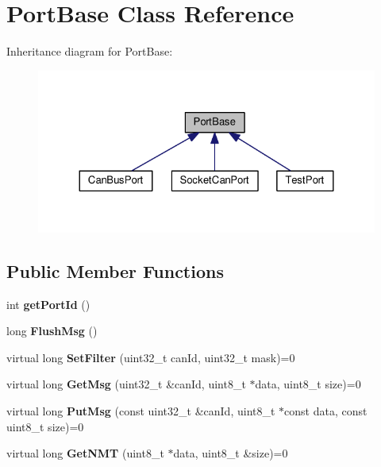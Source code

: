 \hypertarget{classPortBase}{}\section{Port\+Base Class Reference}
\label{classPortBase}


Inheritance diagram for Port\+Base\+:
\nopagebreak
\begin{figure}[H]
\begin{center}
\leavevmode
\includegraphics[width=324pt]{classPortBase__inherit__graph}
\end{center}
\end{figure}
\subsection*{Public Member Functions}
\begin{DoxyCompactItemize}
\item 
\mbox{\label{classPortBase_a45ec4a2cd5e17e098f6f72677437f066}} 
int {\bfseries get\+Port\+Id} ()
\item 
\mbox{\label{classPortBase_a913932fc850e9aebc947542773c669ad}} 
long {\bfseries Flush\+Msg} ()
\item 
\mbox{\label{classPortBase_a1d857a81a8e3f3bd460ef7c802ee762c}} 
virtual long {\bfseries Set\+Filter} (uint32\+\_\+t can\+Id, uint32\+\_\+t mask)=0
\item 
\mbox{\label{classPortBase_a57e891d3992f70dea5c5e403350088be}} 
virtual long {\bfseries Get\+Msg} (uint32\+\_\+t \&can\+Id, uint8\+\_\+t $\ast$data, uint8\+\_\+t size)=0
\item 
\mbox{\label{classPortBase_a26213ebb6ea0a0b77f60c28944e3bb8e}} 
virtual long {\bfseries Put\+Msg} (const uint32\+\_\+t \&can\+Id, uint8\+\_\+t $\ast$const data, const uint8\+\_\+t size)=0
\item 
\mbox{\label{classPortBase_abab2bf17b01d87c2bca01cb2151aa2f1}} 
virtual long {\bfseries Get\+N\+MT} (uint8\+\_\+t $\ast$data, uint8\+\_\+t \&size)=0
\end{DoxyCompactItemize}
